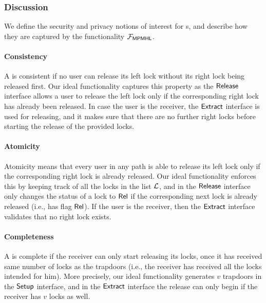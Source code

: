 \subsubsection{Discussion}
\label{sec:mpmhl-discussion}

We define the security and privacy notions of interest for {\sysname}s, and describe how they 
are captured by the functionality $\mathcal{F}_{\mathsf{MPMHL}}$.


\paragraph{Consistency} A \sysname is consistent if no user can release its left lock without its 
right lock being released first. Our ideal functionality captures this property as the $\mathsf{Release}$ 
interface allows a user to release the left lock only if the corresponding right lock has already 
been released. In case the user is the receiver, the $\mathsf{Extract}$ interface is used for releasing, 
and it makes sure that there are no further right locks before starting the release of the 
provided locks.


\paragraph{Atomicity} Atomicity means that every user in any path is able to release its left 
lock only if the corresponding right lock is already released. Our ideal functionality enforces 
this by keeping track of all the locks in the list $\mathcal{L}$, and in the $\mathsf{Release}$ interface only 
changes the status of a lock to $\mathsf{Rel}$ if the corresponding next lock is already released (i.e., 
has flag $\mathsf{Rel}$). If the user is the receiver, then the $\mathsf{Extract}$ interface validates that no 
right lock exists.

\paragraph{Completeness} A \sysname is complete if the receiver can only start releasing its 
locks, once it has received same number of locks as the trapdoors (i.e., the receiver has 
received all the locks intended for him). More precisely, our ideal functionality generates 
$v$ trapdoors in the $\mathsf{Setup}$ interface, and in the $\mathsf{Extract}$ interface the release can only 
begin if the receiver has $v$ locks as well.

